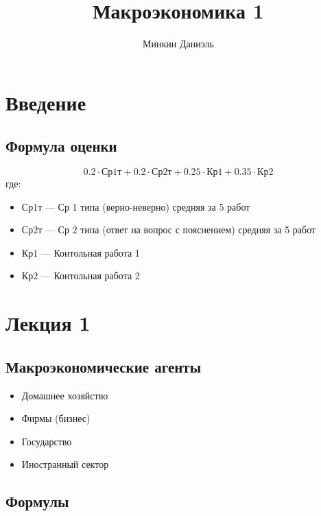 \documentclass{article}
\title{Макроэкономика 1}
\author{Минкин Даниэль}
\begin{document}
    \maketitle

    \tableofcontents %


    \section{Введение}

    \subsection{Формула оценки}

    \begin{equation}
        0.2 \cdot \text{Ср1т} + 0.2 \cdot \text{Ср2т} + 0.25 \cdot \text{Кр1} + 0.35 \cdot \text{Кр2}
    \end{equation}
    где:
    \begin{itemize}
        \item $\text{Ср1т}$ --- Ср 1 типа (верно-неверно) средняя за 5 работ
        \item $\text{Ср2т}$ --- Ср 2 типа (ответ на вопрос с пояснением) средняя за 5 работ
        \item $\text{Кр1}$ --- Контольная работа 1
        \item $\text{Кр2}$ --- Контольная работа 2
    \end{itemize}


    \section{Лекция 1}

    \subsection{Макроэкономические агенты}

    \begin{itemize}
        \item Домашнее хозяйство
        \item Фирмы (бизнес)
        \item Государство
        \item Иностранный сектор
    \end{itemize}

    \subsection{Формулы}
\end{document}
